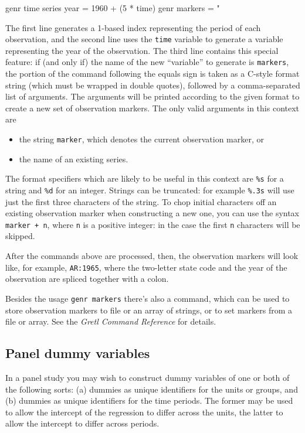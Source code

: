 \begin{code}
genr time
series year = 1960 + (5 * time)
genr markers = "%
\end{code}

The first line generates a 1-based index representing the period of
each observation, and the second line uses the \texttt{time} variable
to generate a variable representing the year of the observation.  The
third line contains this special feature: if (and only if) the name of
the new ``variable'' to generate is \texttt{markers}, the portion of
the command following the equals sign is taken as a C-style format
string (which must be wrapped in double quotes), followed by a
comma-separated list of arguments.  The arguments will be printed
according to the given format to create a new set of observation
markers.  The only valid arguments in this context are
\begin{itemize}
\item the string \texttt{marker}, which denotes the current observation
  marker, or
\item the name of an existing series.
\end{itemize}
The format specifiers which are likely to be useful in this context are
\texttt{\%s} for a string and \texttt{\%d} for an integer.  Strings can
be truncated: for example \texttt{\%.3s} will use just the first three
characters of the string.  To chop initial characters off an existing
observation marker when constructing a new one, you can use the syntax
\texttt{marker + n}, where \texttt{n} is a positive integer: in the case
the first \texttt{n} characters will be skipped.

After the commands above are processed, then, the observation markers
will look like, for example, \texttt{AR:1965}, where the two-letter
state code and the year of the observation are spliced together with a
colon.

Besides the usage \texttt{genr markers} there's also a 
command, which can be used to store observation markers to file or an
array of strings, or to set markers from a file or array. See the
\emph{Gretl Command Reference} for details.

\subsection{Panel dummy variables}
\label{panel-dummies}

In a panel study you may wish to construct dummy variables of one or
both of the following sorts: (a) dummies as unique identifiers for the
units or groups, and (b) dummies as unique identifiers for the time
periods.  The former may be used to allow the intercept of the
regression to differ across the units, the latter to allow the
intercept to differ across periods.


